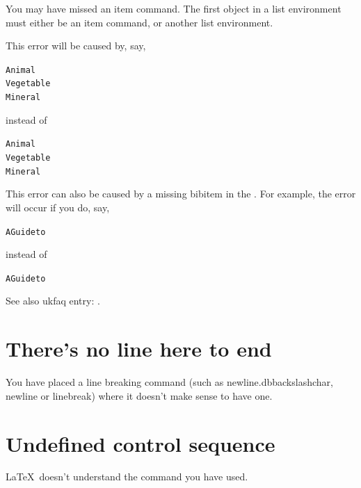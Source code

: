 You may have missed an \gls{item} command.  The first object in
a list environment must either be an \gls{item} command, or another
list environment.

This error will be caused by, say,
\begin{alltt}\wrong
{}
Animal
 Vegetable
 Mineral
\end{alltt}
instead of
\begin{alltt}\correct
{}
 Animal
 Vegetable
 Mineral
\end{alltt}

\bookpagebreak
This error can also be caused by a missing \gls{bibitem} in the
.  For example, the error will occur
if you do, say,
\begin{alltt}\wrong
{}
A Guide to 
\end{alltt}
instead of
\begin{alltt}\correct
{}
 A Guide to 
\end{alltt}

See also \gls{ukfaq} entry: .


\section{There's no line here to end}

You have placed a line breaking command (such as \gls{newline.dbbackslashchar},
\gls{newline} or \gls{linebreak}) where it doesn't make
sense to have one.


\section{Undefined control sequence}

\LaTeX\ doesn't understand the \gls{command} you
have used.  

